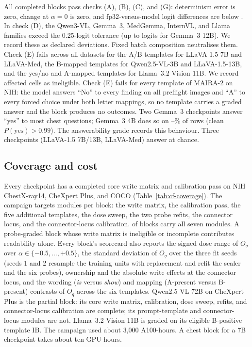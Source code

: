 \documentclass{article}
\begin{document}
All \cfWriteBlocks{} completed blocks pass checks (A), (B), (C), and (G): determinism error is zero, change at $\alpha=0$ is zero, and fp32-versus-model logit differences are below \cfGateFpMax{}. In check (D), the Qwen3-VL, Gemma~3, MedGemma, InternVL, and Llama families exceed the 0.25-logit tolerance (up to \cfGateBatchMax{} logits for Gemma~3 12B). We record these as declared deviations. Fixed batch composition neutralises them. Check (E) fails across all datasets for the A/B templates for LLaVA-1.5-7B and LLaVA-Med, the B-mapped templates for Qwen2.5-VL-3B and LLaVA-1.5-13B, and the yes/no and A-mapped templates for Llama~3.2 Vision 11B. We record affected cells as ineligible. Check (E) fails for every template of MAIRA-2 \citep{bannur2024maira} on NIH: the model answers ``No'' to every finding on all \cfSpecUngradedRows{} preflight images and ``A'' to every forced choice under both letter mappings, so no template carries a graded answer and the block produces no outcomes. Two Gemma~3 checkpoints answer ``yes'' to most chest questions; Gemma~3 4B does so on \cfGemmaFourYesMin--\cfGemmaFourYesMax\% of rows (clean $P(\mathrm{yes})>0.99$). The answerability grade records this behaviour. Three checkpoints (LLaVA-1.5 7B/13B, LLaVA-Med) answer at chance.

\subsection{Coverage and cost}
\label{app:cf-coverage}

Every checkpoint has a completed core write matrix and calibration pass on NIH ChestX-ray14, CheXpert Plus, and COCO (Table~\ref{tab:cf-coverage}). The campaign targets \cfCoveragePlannedWord{} modules per block: the write matrix, the calibration pass, the five additional templates, the dose sweep, the two probe refits, the connector locus, and the connector-locus calibration. \cfCoverageBlocksAllSeven{} of \cfBlocks{} blocks carry all seven modules. A probe-graded block whose write matrix is ineligible or incomplete contributes readability alone. Every block's scorecard also reports the signed dose range of $O_q$ over $\alpha\in\{-0.5,\ldots,+0.5\}$, the standard deviation of $O_q$ over the three fit seeds (seeds 1 and 2 resample the training units with replacement and refit the scaler and the six probes), ownership and the absolute write effects at the connector locus, and the wording (\emph{is} versus \emph{show}) and mapping (A-present versus B-present) contrasts of $O_q$ across the six templates. Qwen2.5-VL-72B on CheXpert Plus is the partial block: its core write matrix, calibration, dose sweep, refits, and connector-locus calibration are complete; its prompt-template and connector-locus modules are not. Llama~3.2 Vision 11B is graded on its eligible B-positive template IB. The campaign used about 3,000 A100-hours. A chest block for a 7B checkpoint takes about ten GPU-hours.
\end{document}
